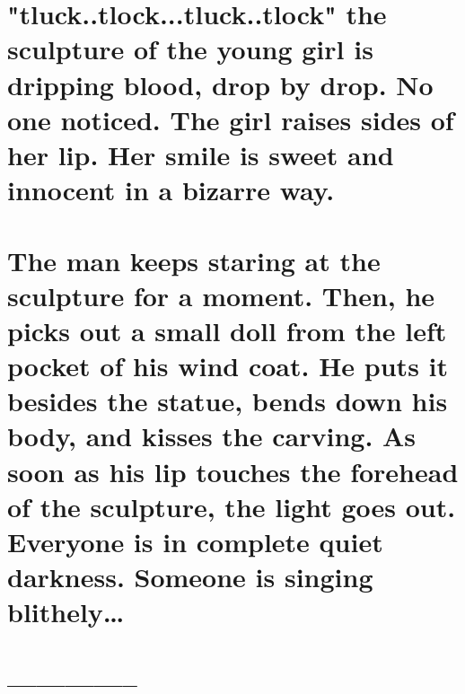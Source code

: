 \documentclass{article}
\begin{document}
\section{"tluck..tlock...tluck..tlock" the sculpture of the young girl is dripping blood, drop by drop. No one noticed. The girl raises sides of her lip. Her smile is sweet and innocent in a bizarre way. } 
\section{The man keeps staring at the sculpture for a moment. Then, he picks out a small doll from the left pocket of his wind coat. He puts it besides the statue, bends down his body, and kisses the carving. As soon as his lip touches the forehead of the sculpture, the light goes out. Everyone is in complete quiet darkness. Someone is singing blithely…}

\section{--------------}
\end{document}
